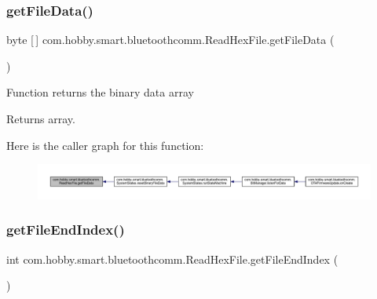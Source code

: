 \subsubsection{\texorpdfstring{get\+File\+Data()}{getFileData()}}
{\footnotesize\ttfamily byte \mbox{[}$\,$\mbox{]} com.\+hobby.\+smart.\+bluetoothcomm.\+Read\+Hex\+File.\+get\+File\+Data (\begin{DoxyParamCaption}{ }\end{DoxyParamCaption})}

Function returns the binary data array \begin{DoxyReturn}{Returns}
array. 
\end{DoxyReturn}
Here is the caller graph for this function\+:\nopagebreak
\begin{figure}[H]
\begin{center}
\leavevmode
\includegraphics[width=350pt]{classcom_1_1hobby_1_1smart_1_1bluetoothcomm_1_1_read_hex_file_aabeb84cb2140d7033dc0a4ac2f3e3fb0_icgraph}
\end{center}
\end{figure}
\mbox{\label{classcom_1_1hobby_1_1smart_1_1bluetoothcomm_1_1_read_hex_file_aa9a9b3a41b9658187eb0b48c0ebc1271}} 
\subsubsection{\texorpdfstring{get\+File\+End\+Index()}{getFileEndIndex()}}
{\footnotesize\ttfamily int com.\+hobby.\+smart.\+bluetoothcomm.\+Read\+Hex\+File.\+get\+File\+End\+Index (\begin{DoxyParamCaption}{ }\end{DoxyParamCaption})}

